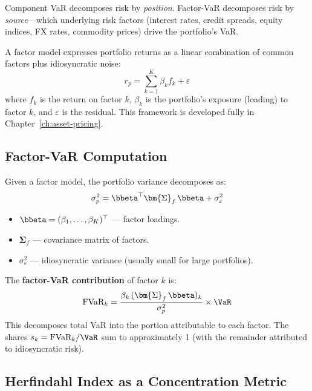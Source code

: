 Component VaR decomposes risk by \emph{position}.  Factor-VaR
decomposes risk by \emph{source}---which underlying risk factors
(interest rates, credit spreads, equity indices, FX rates, commodity
prices) drive the portfolio's VaR.

\begin{prereq}
A factor model expresses portfolio returns as a linear combination of
common factors plus idiosyncratic noise:
\[
  r_p = \sum_{k=1}^K \beta_k f_k + \varepsilon
\]
where $f_k$ is the return on factor $k$, $\beta_k$ is the portfolio's
exposure (loading) to factor $k$, and $\varepsilon$ is the residual.
This framework is developed fully in Chapter~\ref{ch:asset-pricing}.
\end{prereq}

\subsection{Factor-VaR Computation}

Given a factor model, the portfolio variance decomposes as:
\begin{equation}
\label{eq:factor-var-decomp}
\sigma_p^2 = \bbeta^\top \bm{\Sigma}_f \, \bbeta + \sigma_\varepsilon^2
\end{equation}
\begin{itemize}[nosep]
  \item $\bbeta = (\beta_1, \ldots, \beta_K)^\top$ --- factor loadings.
  \item $\bm{\Sigma}_f$ --- covariance matrix of factors.
  \item $\sigma_\varepsilon^2$ --- idiosyncratic variance (usually small
        for large portfolios).
\end{itemize}

The \textbf{factor-VaR contribution} of factor $k$ is:
\begin{equation}
\label{eq:factor-cvar}
\text{FVaR}_k = \frac{\beta_k \,(\bm{\Sigma}_f\,\bbeta)_k}
  {\sigma_p^2} \times \VaR
\end{equation}
This decomposes total VaR into the portion attributable to each factor.
The shares $s_k = \text{FVaR}_k / \VaR$ sum to approximately 1 (with the
remainder attributed to idiosyncratic risk).

\subsection{Herfindahl Index as a Concentration Metric}
\label{subsec:hhi}

